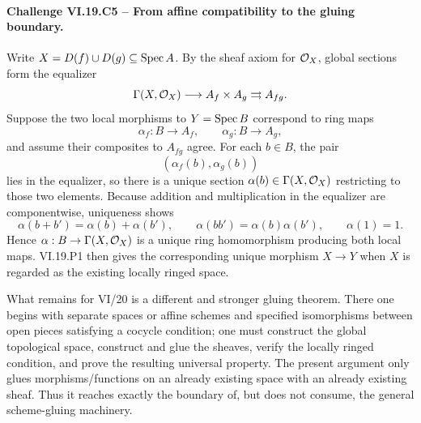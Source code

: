 \paragraph{Challenge VI.19.C5 -- From affine compatibility to the gluing boundary.}
\begin{solution}
Write \(X=D(f)\cup D(g)\subseteq\operatorname{Spec} A\).  By the sheaf axiom for \(\mathcal O_X\), global sections form the equalizer
\[
\Gamma(X,\mathcal O_X)
\longrightarrow A_f\times A_g
\rightrightarrows A_{fg}.
\]
Suppose the two local morphisms to \(Y=\operatorname{Spec} B\) correspond to ring maps
\[
\alpha_f:B\to A_f,
\qquad
\alpha_g:B\to A_g,
\]
and assume their composites to \(A_{fg}\) agree.  For each \(b\in B\), the pair
\[
(\alpha_f(b),\alpha_g(b))
\]
lies in the equalizer, so there is a unique section \(\alpha(b)\in\Gamma(X,\mathcal O_X)\) restricting to those two elements.  Because addition and multiplication in the equalizer are componentwise, uniqueness shows
\[
\alpha(b+b')=\alpha(b)+\alpha(b'),\qquad
\alpha(bb')=\alpha(b)\alpha(b'),\qquad
\alpha(1)=1.
\]
Hence \(\alpha:B\to\Gamma(X,\mathcal O_X)\) is a unique ring homomorphism producing both local maps.  VI.19.P1 then gives the corresponding unique morphism \(X\to Y\) when \(X\) is regarded as the existing locally ringed space.

What remains for VI/20 is a different and stronger gluing theorem.  There one begins with separate spaces or affine schemes and specified isomorphisms between open pieces satisfying a cocycle condition; one must construct the global topological space, construct and glue the sheaves, verify the locally ringed condition, and prove the resulting universal property.  The present argument only glues morphisms/functions on an already existing space with an already existing sheaf.  Thus it reaches exactly the boundary of, but does not consume, the general scheme-gluing machinery.
\end{solution}

